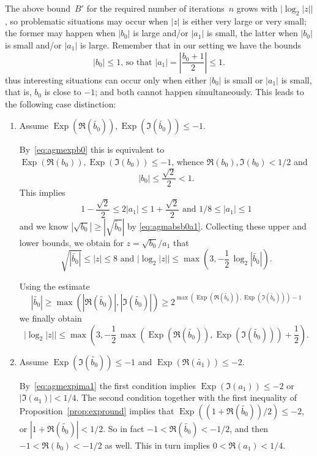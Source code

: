 \documentclass [11pt]{article}
\newcommand {\appro}[1]{\widetilde {#1}}
\DeclareMathOperator{\Exp}{\operatorname {Exp}}
\renewcommand {\leq}{\leqslant}
\renewcommand {\geq}{\geqslant}
\begin{document}
The above bound~$B'$ for the required number of iterations~$n$ grows with
$\big| \log_2 |z| \big|$, so problematic situations may occur when $|z|$
is either very large or very small; the former may happen when $|b_0|$ is
large and/or $|a_1|$ is small, the latter when $|b_0|$ is small and/or
$|a_1|$ is large.
Remember that in our setting we have the bounds
\[
|b_0| \leq 1 \text {, so that }
|a_1| = \left| \frac {b_0 + 1}{2} \right| \leq 1.
\]
thus interesting situations can occur only when either
$|b_0|$ is small or $|a_1|$ is small, that is, $b_0$ is close to $-1$;
and both cannot happen simultaneously. This leads to the following
case distinction:
\begin {enumerate}
\item
Assume $\Exp (\Re (\appro {b_0})), \Exp (\Im (\appro {b_0})) \leq -1$.

By~\eqref {eq:agmexpb0} this is equivalent to
$\Exp (\Re (b_0)), \Exp (\Im (b_0)) \leq -1$, whence
$\Re (b_0), \Im (b_0) < 1/2$ and
\[
|b_0| \leq \frac {\sqrt 2}{2} < 1.
\]
This implies
\[
1 - \frac {\sqrt 2}{2} \leq 2 |a_1| \leq 1 + \frac {\sqrt 2}{2}
\text { and }
1/8 \leq |a_1| \leq 1
\]
and we know $|\sqrt {b_0}| \geq \left| \sqrt {\appro {b_0}} \right|$
by \eqref {eq:agmabsb0a1}. Collecting these upper and lower bounds,
we obtain for $z = \sqrt {b_0} / a_1$ that
\[
\sqrt {\left| \appro {b_0} \right|} \leq |z| \leq 8
\text { and }
\big| \log_2 |z| \big| \leq
\max \left(
3, - \frac {1}{2} \, \log_2 \left| \appro {b_0} \right|
\right).
\]

Using the estimate
\[
\left| \appro {b_0} \right|
\geq \max \left( |\Re (\appro {b_0})|, |\Im (\appro {b_0})| \right)
\geq
2^{\max \left( \Exp (\Re (\appro {b_0})), \Exp (\Im (\appro {b_0})) \right)
- 1}
\]
we finally obtain
\begin {equation}
\label {eq:agmlb}
\big| \log_2 |z| \big| \leq
\max \left(
3, - \frac {1}{2} \,
\max \left( \Exp (\Re (\appro {b_0})), \Exp (\Im (\appro {b_0})) \right)
+ \frac {1}{2}
\right).
\end {equation}

\item
Assume $\Exp (\Im (\appro {b_0})) \leq -1$ and
$\Exp (\Re (\appro {a_1})) \leq -2$.

By~\eqref {eq:agmexpima1} the first condition implies
$\Exp (\Im (a_1)) \leq -2$ or $|\Im (a_1)| < 1/4$.
The second condition together with the first inequality of
Proposition~\ref {prop:expround} implies that
$\Exp \left( (1 + \Re (\appro {b_0})) / 2 \right) \leq -2$,
or $\left| 1 + \Re (\appro {b_0}) \right| < 1/2$.
So in fact $-1 < \Re (\appro {b_0}) < -1/2$, and then
$-1 < \Re (b_0) < -1/2$ as well. This in turn implies
$0 < \Re (a_1) < 1/4$.


\end{enumerate}
\end{document}
